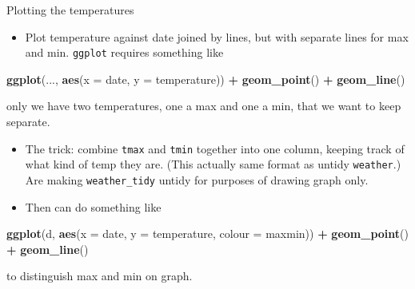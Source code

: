 \documentclass[
  ignorenonframetext,
]{beamer}
\newenvironment{Shaded}{\begin{snugshade}}{\end{snugshade}}
\newcommand{\DataTypeTok}[1]{\textcolor[rgb]{0.13,0.29,0.53}{#1}}
\newcommand{\KeywordTok}[1]{\textcolor[rgb]{0.13,0.29,0.53}{\textbf{#1}}}
\newcommand{\NormalTok}[1]{#1}
\newcommand{\OperatorTok}[1]{\textcolor[rgb]{0.81,0.36,0.00}{\textbf{#1}}}
\newcommand{\StringTok}[1]{\textcolor[rgb]{0.31,0.60,0.02}{#1}}
\providecommand{\tightlist}{%
  \setlength{\itemsep}{0pt}\setlength{\parskip}{0pt}}
\begin{document}
\begin{frame}[fragile]{Plotting the temperatures}
\protect\hypertarget{plotting-the-temperatures}{}

\begin{itemize}
\tightlist
\item
  Plot temperature against date joined by lines, but with separate lines
  for max and min. \texttt{ggplot} requires something like
\end{itemize}

\footnotesize

\begin{Shaded}
\begin{Highlighting}[]
\KeywordTok{ggplot}\NormalTok{(..., }\KeywordTok{aes}\NormalTok{(}\DataTypeTok{x =}\NormalTok{ date, }\DataTypeTok{y =}\NormalTok{ temperature)) }\OperatorTok{+}\StringTok{ }\KeywordTok{geom_point}\NormalTok{() }\OperatorTok{+}\StringTok{ }
\StringTok{  }\KeywordTok{geom_line}\NormalTok{()}
\end{Highlighting}
\end{Shaded}

\normalsize

only we have two temperatures, one a max and one a min, that we want to
keep separate.

\begin{itemize}
\tightlist
\item
  The trick: combine \texttt{tmax} and \texttt{tmin} together into one
  column, keeping track of what kind of temp they are. (This actually
  same format as untidy \texttt{weather}.) Are making
  \texttt{weather\_tidy} untidy for purposes of drawing graph only.
\item
  Then can do something like
\end{itemize}

\footnotesize

\begin{Shaded}
\begin{Highlighting}[]
\KeywordTok{ggplot}\NormalTok{(d, }\KeywordTok{aes}\NormalTok{(}\DataTypeTok{x =}\NormalTok{ date, }\DataTypeTok{y =}\NormalTok{ temperature, }\DataTypeTok{colour =}\NormalTok{ maxmin)) }
  \OperatorTok{+}\StringTok{ }\KeywordTok{geom_point}\NormalTok{() }\OperatorTok{+}\StringTok{ }\KeywordTok{geom_line}\NormalTok{()}
\end{Highlighting}
\end{Shaded}

\normalsize

to distinguish max and min on graph.

\end{frame}
\end{document}
